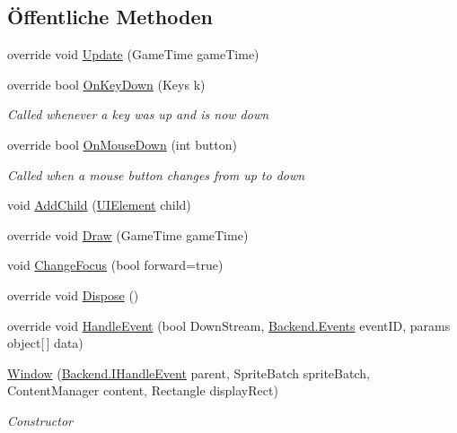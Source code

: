 \subsection*{Öffentliche Methoden}
\begin{DoxyCompactItemize}
\item 
override void \hyperlink{class_gruppe22_1_1_client_1_1_window_aec6e5dacbb02d585132ee1f799937aaa}{Update} (Game\-Time game\-Time)
\item 
override bool \hyperlink{class_gruppe22_1_1_client_1_1_window_ac71cd9635bec479f506ae2e7096b6617}{On\-Key\-Down} (Keys k)
\begin{DoxyCompactList}\small\item\em Called whenever a key was up and is now down \end{DoxyCompactList}\item 
override bool \hyperlink{class_gruppe22_1_1_client_1_1_window_a7bc0acea2d6e974e3b12ff29bf16333d}{On\-Mouse\-Down} (int button)
\begin{DoxyCompactList}\small\item\em Called when a mouse button changes from up to down \end{DoxyCompactList}\item 
void \hyperlink{class_gruppe22_1_1_client_1_1_window_aa25423364d8386d5c4b3878906a2565f}{Add\-Child} (\hyperlink{class_gruppe22_1_1_client_1_1_u_i_element}{U\-I\-Element} child)
\item 
override void \hyperlink{class_gruppe22_1_1_client_1_1_window_a36c526268f11ddcf3bdb0d8dd4979c60}{Draw} (Game\-Time game\-Time)
\item 
void \hyperlink{class_gruppe22_1_1_client_1_1_window_ac6a6bca2fdb223d72a8a5a5b478f98d3}{Change\-Focus} (bool forward=true)
\item 
override void \hyperlink{class_gruppe22_1_1_client_1_1_window_a739e05296bc72eba8f0876d0372c9d26}{Dispose} ()
\item 
override void \hyperlink{class_gruppe22_1_1_client_1_1_window_a9a679d02be82c36731063a0a9c58ba22}{Handle\-Event} (bool Down\-Stream, \hyperlink{namespace_gruppe22_1_1_backend_ab56df91bb0bdafa1ea978e552209ce73}{Backend.\-Events} event\-I\-D, params object\mbox{[}$\,$\mbox{]} data)
\item 
\hyperlink{class_gruppe22_1_1_client_1_1_window_a5f8ffce1aa48181299acf64e7c88996d}{Window} (\hyperlink{interface_gruppe22_1_1_backend_1_1_i_handle_event}{Backend.\-I\-Handle\-Event} parent, Sprite\-Batch sprite\-Batch, Content\-Manager content, Rectangle display\-Rect)
\begin{DoxyCompactList}\small\item\em Constructor \end{DoxyCompactList}\end{DoxyCompactItemize}
